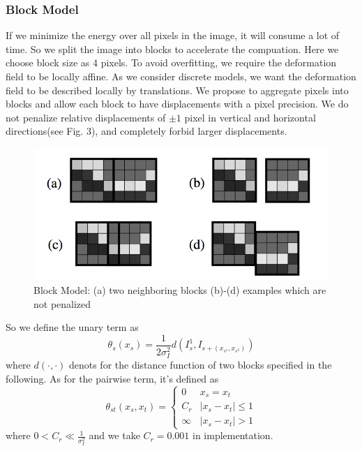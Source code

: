 \documentclass{article} %
\begin{document}
		\subsubsection{Block Model}
			If we minimize the energy over all pixels in the image, it will consume a lot of time. So we split the image into blocks to accelerate the compuation. Here we choose block size as 4 pixels. To avoid overfitting, we require the deformation field to be locally affine. As we consider discrete models, we want the deformation field to be described locally by translations. We propose to aggregate pixels into blocks and allow each block to have displacements with a pixel precision. We do not penalize relative displacements of $\pm 1$ pixel in vertical and horizontal directions(see Fig. 3), and completely forbid larger displacements.
			\begin{figure}[!hb]
			\centering
			\includegraphics[scale = 0.85]{block.png}
			\caption{Block Model: (a) two neighboring blocks (b)-(d) examples which are not penalized}
			\end{figure}
			So we define the unary term as
			\begin{equation}
				\theta_s(x_s) = \frac{1}{2\sigma_I^2} d(I_s^1, I_{s+(x_{s^1}, x_{s^2})})
			\end{equation}
			where $d(\cdot,\cdot)$ denots for the distance function of two blocks specified in the following. As for the pairwise term, it's defined as
			\begin{equation}
				\theta_{st}(x_s, x_t) = \left\{\begin{array}{ll}
				0 & x_s = x_t \\
				C_r & |x_s - x_t| \leqslant 1\\
				\infty & |x_s - x_t| > 1
				\end{array}\right.
			\end{equation}
			where $\displaystyle{0 < C_r \ll \frac{1}{\sigma_I^2}}$ and we take $C_r = 0.001$ in implementation.
\end{document}
